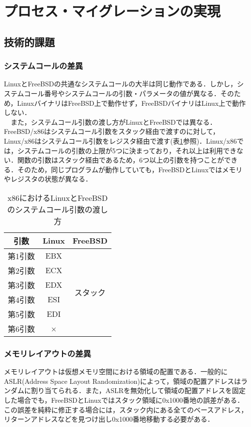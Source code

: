 \documentclass[11pt]{jarticle}
\begin{document}
\section{プロセス・マイグレーションの実現}
\label{sec:PM}
\subsection{技術的課題}
\subsubsection{システムコールの差異}
LinuxとFreeBSDの共通なシステムコールの大半は同じ動作である．しかし，システムコール番号やシステムコールの引数・パラメータの値が異なる．そのため，LinuxバイナリはFreeBSD上で動作せず，FreeBSDバイナリはLinux上で動作しない．\\
　また，システムコール引数の渡し方がLinuxとFreeBSDでは異なる．FreeBSD/x86はシステムコール引数をスタック経由で渡すのに対して，Linux/x86はシステムコール引数をレジスタ経由で渡す(表\ref{tb:argument}参照)．Linux/x86では，システムコールの引数の上限が5つに決まっており，それ以上は利用できない．関数の引数はスタック経由であるため，6つ以上の引数を持つことができる．そのため，同じプログラムが動作していても，FreeBSDとLinuxではメモリやレジスタの状態が異なる．

\begin{table}
  \caption{x86におけるLinuxとFreeBSDのシステムコール引数の渡し方}
  \label{tb:argument}
  \begin{center}
  \begin{tabular}{|c|c|c|} \hline
    引数 & Linux & FreeBSD \\ \hline \hline
    第1引数 & EBX &\multirow{6}{*}{スタック}   \\ \cline{1-2}
    第2引数 & ECX &  \\ \cline{1-2}
    第3引数 & EDX &  \\ \cline{1-2}
    第4引数 & ESI & \\ \cline{1-2}
    第5引数 & EDI &  \\ \cline{1-2}
    第6引数 & × &  \\ \hline
  \end{tabular}
\end{center}
\end{table}

\subsubsection{メモリレイアウトの差異}
メモリレイアウトは仮想メモリ空間における領域の配置である．一般的にASLR(Address Space Layout Randomization)によって，領域の配置アドレスはランダムに割り当てられる．また，ASLRを無効化して領域の配置アドレスを固定した場合でも，FreeBSDとLinuxではスタック領域に0x1000番地の誤差がある．この誤差を純粋に修正する場合には，スタック内にある全てのベースアドレス，リターンアドレスなどを見つけ出し0x1000番地移動する必要がある．
\end{document}
